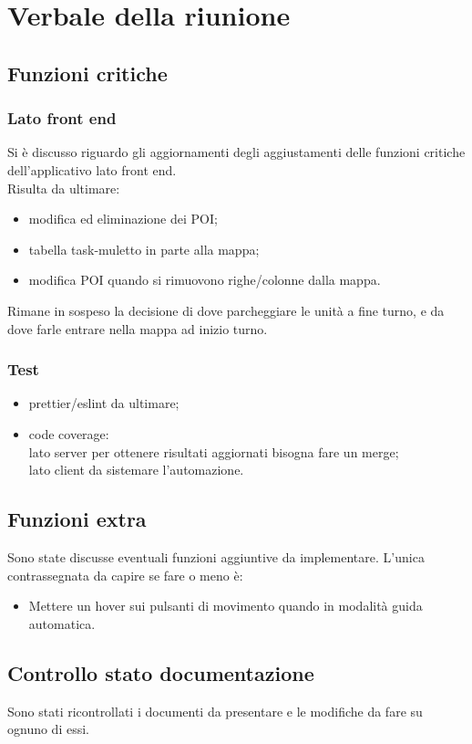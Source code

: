 \section{Verbale della riunione}

\subsection{Funzioni critiche}
\subsubsection{Lato front end}
Si è discusso riguardo gli aggiornamenti degli aggiustamenti delle funzioni critiche dell'applicativo lato front end.
\\Risulta da ultimare:
\begin{itemize}
	\item modifica ed eliminazione dei POI;
	\item tabella task-muletto in parte alla mappa;
	\item modifica POI quando si rimuovono righe/colonne dalla mappa.
\end{itemize}
Rimane in sospeso la decisione di dove parcheggiare le unità a fine turno, e da dove farle entrare nella mappa ad inizio turno.
\subsubsection{Test}
\begin{itemize}
	\item prettier/eslint da ultimare;
	\item code coverage: \\lato server per ottenere risultati aggiornati bisogna fare un merge;\\lato client da sistemare l'automazione.
\end{itemize}

\subsection{Funzioni extra}
Sono state discusse eventuali funzioni aggiuntive da implementare. L'unica contrassegnata da capire se fare o meno è:
\begin{itemize}
	\item Mettere un hover sui pulsanti di movimento quando in modalità guida automatica.
\end{itemize}

\subsection{Controllo stato documentazione}
Sono stati ricontrollati i documenti da presentare e le modifiche da fare su ognuno di essi. 
